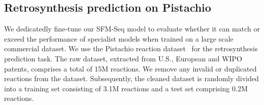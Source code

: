 


\subsection{Retrosynthesis prediction on Pistachio}

We dedicatedly fine-tune our SFM-Seq model to evaluate whether it can match or exceed the performance of specialist models when trained on a large scale commercial dataset. 
We use the Pistachio reaction dataset~\cite{mayfield2017pistachio} for the retrosynthesis prediction task. 
The raw dataset, extracted from U.S., European and WIPO patents, comprises a total of 15M reactions. 
We remove any invalid or duplicated reactions from the dataset.
Subsequently, the cleaned dataset is randomly divided into a training set consisting of 3.1M reactions and a test set comprising 0.2M reactions.


